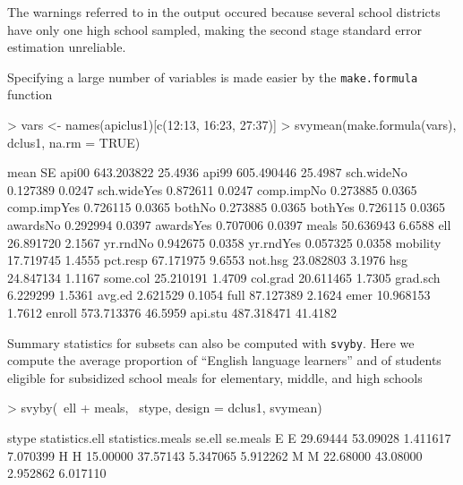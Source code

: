 \documentclass{article}
\begin{document}
The warnings referred to in the output occured because several
school districts have only one high school sampled, making the second
stage standard error estimation unreliable.

Specifying a large number of variables is made easier by the \texttt{make.formula} function
\begin{Schunk}
\begin{Sinput}
> vars <- names(apiclus1)[c(12:13, 16:23, 27:37)]
> svymean(make.formula(vars), dclus1, na.rm = TRUE)
\end{Sinput}
\begin{Soutput}
                  mean      SE
api00       643.203822 25.4936
api99       605.490446 25.4987
sch.wideNo    0.127389  0.0247
sch.wideYes   0.872611  0.0247
comp.impNo    0.273885  0.0365
comp.impYes   0.726115  0.0365
bothNo        0.273885  0.0365
bothYes       0.726115  0.0365
awardsNo      0.292994  0.0397
awardsYes     0.707006  0.0397
meals        50.636943  6.6588
ell          26.891720  2.1567
yr.rndNo      0.942675  0.0358
yr.rndYes     0.057325  0.0358
mobility     17.719745  1.4555
pct.resp     67.171975  9.6553
not.hsg      23.082803  3.1976
hsg          24.847134  1.1167
some.col     25.210191  1.4709
col.grad     20.611465  1.7305
grad.sch      6.229299  1.5361
avg.ed        2.621529  0.1054
full         87.127389  2.1624
emer         10.968153  1.7612
enroll      573.713376 46.5959
api.stu     487.318471 41.4182
\end{Soutput}
\end{Schunk}

Summary statistics for subsets can also be computed with
\texttt{svyby}. Here we compute the average proportion of ``English
language learners'' and of students eligible for subsidized school
meals for elementary, middle, and high schools
\begin{Schunk}
\begin{Sinput}
> svyby(~ell + meals, ~stype, design = dclus1, svymean)
\end{Sinput}
\begin{Soutput}
  stype statistics.ell statistics.meals   se.ell se.meals
E     E       29.69444         53.09028 1.411617 7.070399
H     H       15.00000         37.57143 5.347065 5.912262
M     M       22.68000         43.08000 2.952862 6.017110
\end{Soutput}
\end{Schunk}
\end{document}
